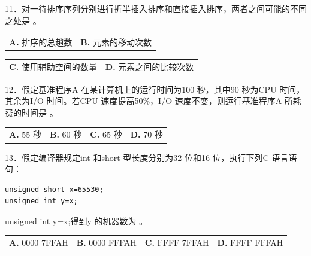 \documentclass[UTF8,11pt]{ctexart}
\begin{document}
11．对一待排序序列分别进行折半插入排序和直接插入排序，两者之间可能的不同之处是 。


\begin{center}\begin{tabular}{>{\raggedright\arraybackslash}p{\dimexpr(\linewidth-4\tabcolsep)/2\relax}>{\raggedright\arraybackslash}p{\dimexpr(\linewidth-4\tabcolsep)/2\relax}}
\textbf{A.} 排序的总趟数 & \textbf{B.} 元素的移动次数\\[.35em]\end{tabular}\end{center}

\begin{center}\begin{tabular}{>{\raggedright\arraybackslash}p{\dimexpr(\linewidth-4\tabcolsep)/2\relax}>{\raggedright\arraybackslash}p{\dimexpr(\linewidth-4\tabcolsep)/2\relax}}
\textbf{C.} 使用辅助空间的数量 & \textbf{D.} 元素之间的比较次数\\[.35em]\end{tabular}\end{center}

12．假定基准程序A 在某计算机上的运行时间为100 秒，其中90 秒为CPU 时间，其余为I/O 时间。若CPU 速度提高50\%，I/O 速度不变，则运行基准程序A 所耗费的时间是 。


\begin{center}\begin{tabular}{>{\raggedright\arraybackslash}p{\dimexpr(\linewidth-8\tabcolsep)/4\relax}>{\raggedright\arraybackslash}p{\dimexpr(\linewidth-8\tabcolsep)/4\relax}>{\raggedright\arraybackslash}p{\dimexpr(\linewidth-8\tabcolsep)/4\relax}>{\raggedright\arraybackslash}p{\dimexpr(\linewidth-8\tabcolsep)/4\relax}}
\textbf{A.} 55 秒 & \textbf{B.} 60 秒 & \textbf{C.} 65 秒 & \textbf{D.} 70 秒\\[.35em]\end{tabular}\end{center}

13．假定编译器规定int 和short 型长度分别为32 位和16 位，执行下列C 语言语句：


\begin{Verbatim}[breaklines,breakanywhere,fontsize=\small]
unsigned short x=65530;
unsigned int y=x;
\end{Verbatim}

unsigned int y=x;得到y 的机器数为 。


\begin{center}\begin{tabular}{>{\raggedright\arraybackslash}p{\dimexpr(\linewidth-8\tabcolsep)/4\relax}>{\raggedright\arraybackslash}p{\dimexpr(\linewidth-8\tabcolsep)/4\relax}>{\raggedright\arraybackslash}p{\dimexpr(\linewidth-8\tabcolsep)/4\relax}>{\raggedright\arraybackslash}p{\dimexpr(\linewidth-8\tabcolsep)/4\relax}}
\textbf{A.} 0000 7FFAH & \textbf{B.} 0000 FFFAH & \textbf{C.} FFFF 7FFAH & \textbf{D.} FFFF FFFAH\\[.35em]\end{tabular}\end{center}
\end{document}
